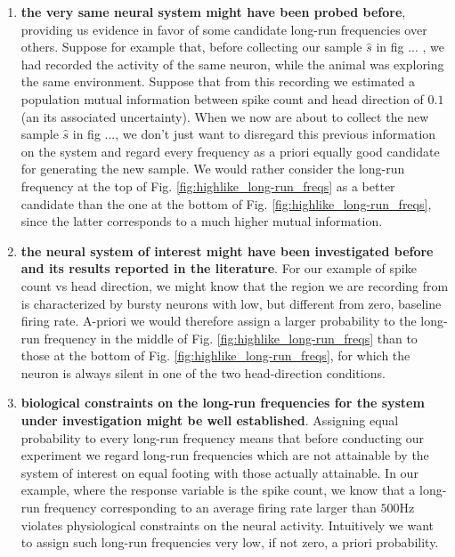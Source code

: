 \begin{enumerate}

\item \textbf{the very same neural system might have been probed before}, providing us evidence in favor of some candidate long-run frequencies over others. Suppose for example that, before collecting our sample $\hat{s}$ in fig ... , we had recorded the activity of the same neuron, while the animal was exploring the same environment. Suppose that from this recording we estimated a population mutual information between spike count and head direction of $0.1$ (an its associated uncertainty). When we now are about to collect the new sample $\hat{s}$ in fig ..., we don't just want to disregard this previous information on the system and regard every frequency as a priori equally good candidate for generating the new sample. We would rather consider the long-run frequency at the top of Fig. \ref{fig:highlike_long-run_freqs} as a better candidate than the one at the bottom of Fig. \ref{fig:highlike_long-run_freqs}, since the latter corresponds to a much higher mutual information. 

\item \textbf{the neural system of interest might have been investigated before and its results reported in the literature}. For our example of spike count vs head direction, we might know that the region we are recording from is characterized by bursty neurons with low, but different from zero, baseline firing rate. A-priori we would therefore assign a larger probability to the long-run frequency in the middle of Fig. \ref{fig:highlike_long-run_freqs} than to those at the bottom of Fig. \ref{fig:highlike_long-run_freqs}, for which the neuron is always silent in one of the two head-direction conditions.  

\item \textbf{biological constraints on the long-run frequencies for the system under investigation might be well established}. Assigning equal probability to every long-run frequency means that before conducting our experiment we regard long-run frequencies which are not attainable by the system of interest on equal footing with those actually attainable. In our example, where the response variable is the spike count, we know that a long-run frequency corresponding to an average firing rate larger than $500$Hz violates physiological constraints on the neural activity. Intuitively we want to assign such long-run frequencies very low, if not zero, a priori probability.

\end{enumerate}


